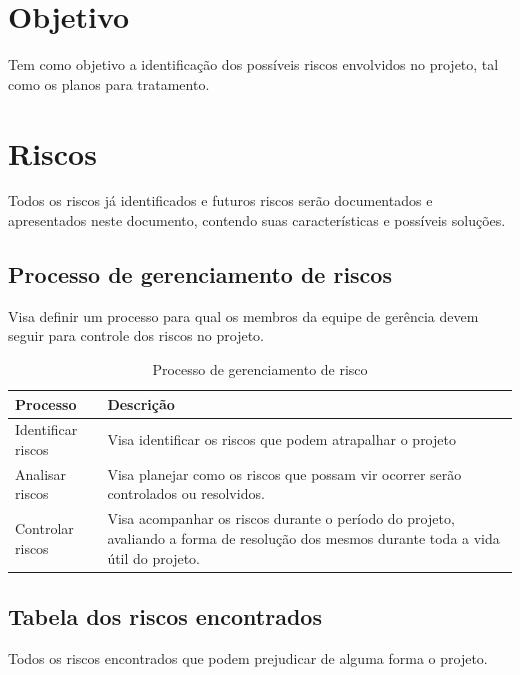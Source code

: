 \section{Objetivo}

  Tem como objetivo a identificação dos possíveis riscos envolvidos no projeto, tal como os planos para tratamento.

\section{Riscos}

  Todos os riscos já identificados e futuros riscos serão documentados e apresentados neste documento, contendo suas
  características e possíveis soluções.

\subsection{Processo de gerenciamento de riscos}

  Visa definir um processo para qual os membros da equipe de gerência devem seguir para controle dos riscos no projeto.

  \begin{table}[!htb]
    \centering
    \begin{tabular}{p{5cm}p{10cm}}
      \toprule
        \textbf{Processo} & \textbf{Descrição} \\
      \midrule
        Identificar riscos  & Visa identificar os riscos que podem atrapalhar o projeto                                         \\ \midrule
        Analisar riscos     & Visa planejar como os riscos que possam vir ocorrer serão controlados ou resolvidos.              \\ \midrule
        Controlar riscos    & Visa acompanhar os riscos durante o período do projeto, avaliando a forma de resolução dos mesmos
                              durante toda a vida útil do projeto.                                                              \\
      \bottomrule
    \end{tabular}
    \caption{Processo de gerenciamento de risco}
  \end{table}

\subsection{Tabela dos riscos encontrados}

  Todos os riscos encontrados que podem prejudicar de alguma forma o projeto.

